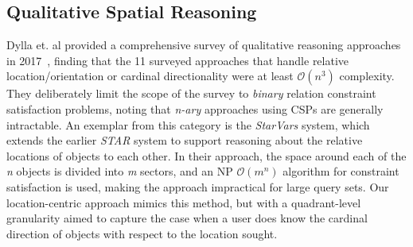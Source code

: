 \subsection{Qualitative Spatial Reasoning}
\par{Dylla et. al provided a comprehensive survey of qualitative reasoning approaches in 2017~\cite{Dylla2017}, finding that the 11 surveyed approaches that handle relative location/orientation or cardinal directionality were at least $\mathcal{O}(n^3)$ complexity. 
They deliberately limit the scope of the survey to \textit{binary} relation constraint satisfaction problems, noting that \textit{n-ary} approaches using CSPs are generally intractable.
An exemplar from this category is the \textit{StarVars} system, which extends the earlier \textit{STAR} system to support reasoning about the relative locations of objects to each other.
In their approach, the space around each of the \textit{n} objects is divided into \textit{m} sectors, and an NP $\mathcal{O}(m^n)$ algorithm for constraint satisfaction is used, making the approach impractical for large query sets.
Our location-centric approach mimics this method, but with a quadrant-level granularity aimed to capture the case when a user does know the cardinal direction of objects with respect to the location sought.}

%





